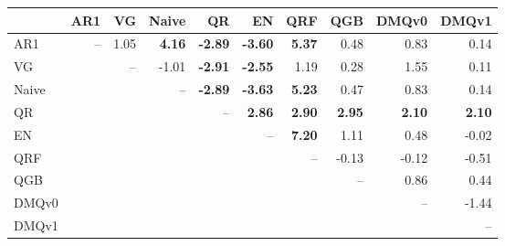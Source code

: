 \begin{tabular}{lrrrrrrrrr}
\toprule
 & AR1 & VG & Naive & QR & EN & QRF & QGB & DMQv0 & DMQv1 \\
\midrule
AR1 & -- & 1.05 & \textbf{4.16} & \textbf{-2.89} & \textbf{-3.60} & \textbf{5.37} & 0.48 & 0.83 & 0.14 \\
VG &  & -- & -1.01 & \textbf{-2.91} & \textbf{-2.55} & 1.19 & 0.28 & 1.55 & 0.11 \\
Naive &  &  & -- & \textbf{-2.89} & \textbf{-3.63} & \textbf{5.23} & 0.47 & 0.83 & 0.14 \\
QR &  &  &  & -- & \textbf{2.86} & \textbf{2.90} & \textbf{2.95} & \textbf{2.10} & \textbf{2.10} \\
EN &  &  &  &  & -- & \textbf{7.20} & 1.11 & 0.48 & -0.02 \\
QRF &  &  &  &  &  & -- & -0.13 & -0.12 & -0.51 \\
QGB &  &  &  &  &  &  & -- & 0.86 & 0.44 \\
DMQv0 &  &  &  &  &  &  &  & -- & -1.44 \\
DMQv1 &  &  &  &  &  &  &  &  & -- \\
\bottomrule
\end{tabular}
